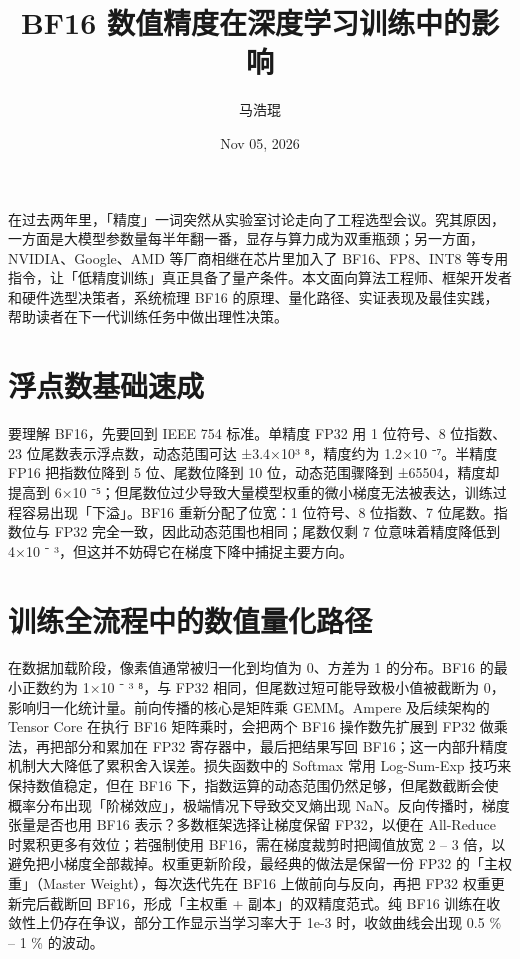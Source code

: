 \title{BF16 数值精度在深度学习训练中的影响}
\author{马浩琨}
\date{Nov 05, 2026}
\maketitle
在过去两年里，「精度」一词突然从实验室讨论走向了工程选型会议。究其原因，一方面是大模型参数量每半年翻一番，显存与算力成为双重瓶颈；另一方面，NVIDIA、Google、AMD 等厂商相继在芯片里加入了 BF16、FP8、INT8 等专用指令，让「低精度训练」真正具备了量产条件。本文面向算法工程师、框架开发者和硬件选型决策者，系统梳理 BF16 的原理、量化路径、实证表现及最佳实践，帮助读者在下一代训练任务中做出理性决策。\par
\chapter{浮点数基础速成}
要理解 BF16，先要回到 IEEE 754 标准。单精度 FP32 用 1 位符号、8 位指数、23 位尾数表示浮点数，动态范围可达 ±3.4×10³ ⁸，精度约为 1.2×10 ⁻⁷。半精度 FP16 把指数位降到 5 位、尾数位降到 10 位，动态范围骤降到 ±65504，精度却提高到 6×10 ⁻⁵；但尾数位过少导致大量模型权重的微小梯度无法被表达，训练过程容易出现「下溢」。BF16 重新分配了位宽：1 位符号、8 位指数、7 位尾数。指数位与 FP32 完全一致，因此动态范围也相同；尾数仅剩 7 位意味着精度降低到 4×10 ⁻ ³，但这并不妨碍它在梯度下降中捕捉主要方向。\par
\chapter{训练全流程中的数值量化路径}
在数据加载阶段，像素值通常被归一化到均值为 0、方差为 1 的分布。BF16 的最小正数约为 1×10 ⁻ ³ ⁸，与 FP32 相同，但尾数过短可能导致极小值被截断为 0，影响归一化统计量。前向传播的核心是矩阵乘 GEMM。Ampere 及后续架构的 Tensor Core 在执行 BF16 矩阵乘时，会把两个 BF16 操作数先扩展到 FP32 做乘法，再把部分和累加在 FP32 寄存器中，最后把结果写回 BF16；这一内部升精度机制大大降低了累积舍入误差。损失函数中的 Softmax 常用 Log-Sum-Exp 技巧来保持数值稳定，但在 BF16 下，指数运算的动态范围仍然足够，但尾数截断会使概率分布出现「阶梯效应」，极端情况下导致交叉熵出现 NaN。反向传播时，梯度张量是否也用 BF16 表示？多数框架选择让梯度保留 FP32，以便在 All-Reduce 时累积更多有效位；若强制使用 BF16，需在梯度裁剪时把阈值放宽 2 – 3 倍，以避免把小梯度全部裁掉。权重更新阶段，最经典的做法是保留一份 FP32 的「主权重」（Master Weight），每次迭代先在 BF16 上做前向与反向，再把 FP32 权重更新完后截断回 BF16，形成「主权重 + 副本」的双精度范式。纯 BF16 训练在收敛性上仍存在争议，部分工作显示当学习率大于 1e-3 时，收敛曲线会出现 0.5 \%{} – 1 \%{} 的波动。\par
